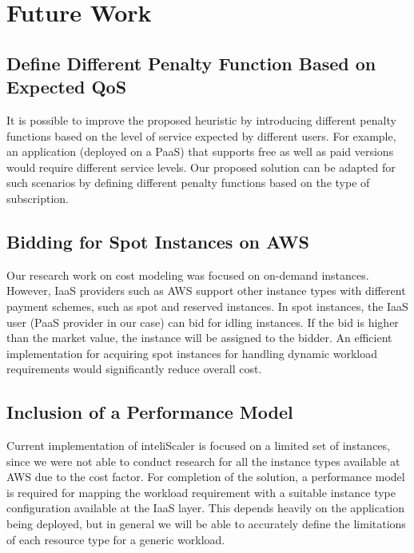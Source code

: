 
\section{Future Work}
\subsection{Define Different Penalty Function Based on Expected QoS}
It is possible to improve the proposed heuristic by introducing different penalty functions  based on the level of service expected by different users. For example, an application (deployed on a PaaS) that supports free as well as paid versions would require different service levels. Our proposed solution can be adapted for such scenarios by defining different penalty functions based on the type of subscription.\\

\subsection{Bidding for Spot Instances on AWS}
Our research work on cost modeling was focused on on-demand instances. However, IaaS providers such as AWS support other instance types with different payment schemes, such as spot and reserved instances. In spot instances, the IaaS user (PaaS provider in our case) can bid for idling instances. If the bid is higher than the market value, the instance will be assigned to the bidder. An efficient implementation for acquiring spot instances for handling dynamic workload requirements would significantly reduce overall cost.

\subsection{Inclusion of a Performance Model}
Current implementation of inteliScaler is focused on a limited set of instances, since we were not able to conduct research for all the instance types available at AWS due to the cost factor. For completion of the solution, a performance model is required for mapping the workload requirement with a suitable instance type configuration available at the IaaS layer. This depends heavily on the application being deployed, but in general we will be able to accurately define the limitations of each resource type for a generic workload. \\


